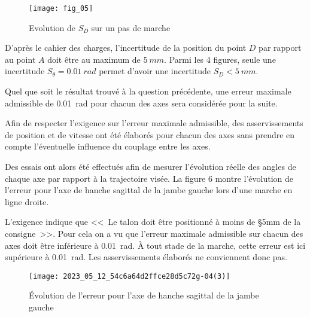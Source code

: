\begin{figure}[!h]
\centering
\texttt{[image: fig\_05]}
\caption{Evolution de $S_D$ sur un pas de marche\label{ccs_psi_2023_fig_05}}
\end{figure}

\fi


\ifprof
\begin{corrige}
D'après le cahier des charges, l'incertitude de la position du point
$D$ par rapport au point  $A$  doit être au maximum de $\SI{5}{mm}$. Parmi les 4 figures, seule une incertitude $S_{\theta}=\SI{0,01}{rad}$ permet d'avoir une incertitude $S_D < \SI{5}{mm}$.
\end{corrige}
\else
\fi

\ifprof
\else
Quel que soit le résultat trouvé à la question précédente, une erreur maximale admissible de \SI{0,01}{rad} pour chacun des axes sera considérée pour la suite.

Afin de respecter l'exigence sur l'erreur maximale admissible, des asservissements de position et de vitesse ont été élaborés pour chacun des axes sans prendre en compte l'éventuelle influence du couplage entre les axes.

Des essais ont alors été effectués afin de mesurer l'évolution réelle des angles de chaque axe par rapport à la trajectoire visée. La figure 6 montre l'évolution de l'erreur pour l'axe de hanche sagittal de la jambe gauche lors d'une marche en ligne droite.
\fi

\ifprof
\begin{corrige}
L'exigence indique que <<~Le talon doit être positionné à moins de
\S{5}{mm} de la consigne~>>. Pour cela on a vu que l'erreur maximale admissible sur chacun des axes doit être inférieure à \SI{0,01}{rad}. À tout stade de la marche, cette erreur est ici supérieure à \SI{0,01}{rad}. Les asservissements élaborés ne conviennent donc pas.
\end{corrige}
\else
\fi

\ifprof
\else

\begin{figure}[!h]
\texttt{[image: 2023\_05\_12\_54c6a64d2ffce28d5c72g-04(3)]}
\caption{Évolution de l'erreur pour l'axe de hanche sagittal de la jambe gauche\label{ccs_psi_2023_fig_06}}
\end{figure}
\fi



